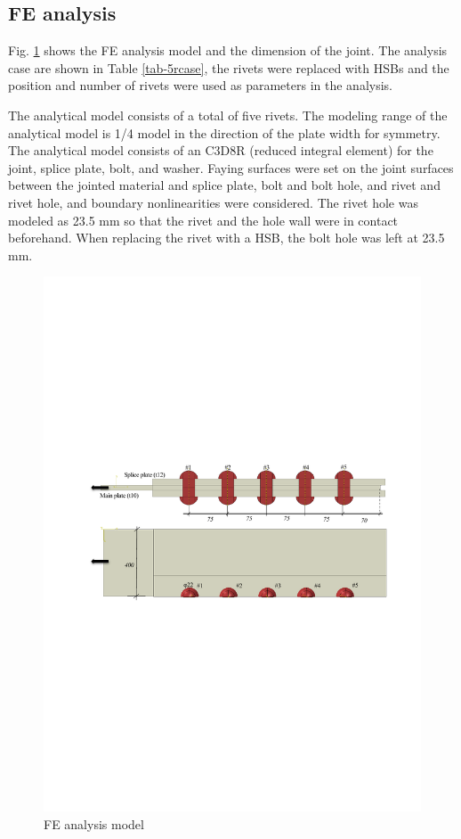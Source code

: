 \subsection{FE analysis}

Fig. \ref{fig-femodl-5r} shows the FE analysis model and the dimension of the joint. The analysis case are shown in Table \ref{tab-5rcase}, the rivets were replaced with \ac{HSB}s and the position and number of rivets were used as parameters in the analysis.

The analytical model consists of a total of five rivets. The modeling range of the analytical model is 1/4 model in the direction of the plate width for symmetry. The analytical model consists of an C3D8R (reduced integral element) for the joint, splice plate, bolt, and washer. Faying surfaces were set on the joint surfaces between the jointed material and splice plate, bolt and bolt hole, and rivet and rivet hole, and boundary nonlinearities were considered. The rivet hole was modeled as 23.5 mm so that the rivet and the hole wall were in contact beforehand. When replacing the rivet with a \ac{HSB}, the bolt hole was left at 23.5 mm.

\begin{figure}[htbp]
    \centering
    \includegraphics[width=0.9\linewidth]{imgs//ch4/fig-femodl-5r.pdf}
    \caption{FE analysis model}
    \label{fig-femodl-5r}
\end{figure}

